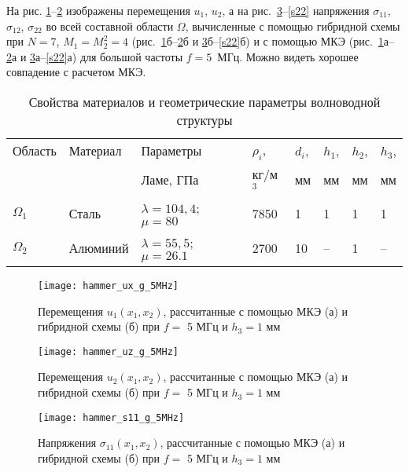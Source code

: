 \documentclass[press]{vestnik}
\begin{document}
На рис. \ref{u1_x}--\ref{u2_x} изображены перемещения $u_{1}$, $u_{2}$, а на рис.~\ref{s11}--\ref{s22} напряжения $\sigma_{11}$, $\sigma_{12}$, $\sigma_{22}$  во всей составной области $\Omega$, вычисленные с помощью гибридной схемы при $N=7$, $M_{1}=M_{2}^{2}=4$ (рис.~\ref{u1_x}б--\ref{u2_x}б и \ref{s11}б--\ref{s22}б) и с помощью МКЭ (рис.~\ref{u1_x}а--\ref{u2_x}а и \ref{s11}а--\ref{s22}а) для большой частоты $f= 5$~МГц. Можно видеть хорошее совпадение с расчетом МКЭ.
\begin{table}[b!] 
	\caption{Свойства материалов и геометрические параметры волноводной структуры} \label{mat}
	\begin{center}
		\begin{tabularx}{\textwidth}{|Y|Y|Y|Y|Y|Y|Y|Y|}
			\hline
			Область  & Материал &  Параметры  &$\rho_{i}$,& $d_{i}$,& $h_{1}$,& $h_{2}$,& $h_{3}$,
			\\
			& &    Ламе, ГПа     &кг/м$^{3}$ &мм & мм & мм & мм
			\\
			\hline
			$\Omega_{1}$ & Сталь & $\lambda=104,4$; $\mu=80$ & 7850 & 1 & 1 & 1 & 1 
			\\
			\hline
			$\Omega_{2}$ & Алюминий & $\lambda=55,5$; $\mu=26.1$ & 2700 & 10 & -- & 1  & -- 
			\\
			\hline
		\end{tabularx}
	\end{center}
\end{table}

\begin{figure}
	\begin{center}
		\texttt{[image: hammer\_ux\_g\_5MHz]}
		\caption{Перемещения $u_{1}(x_{1},x_{2})$, рассчитанные с помощью МКЭ (а) и гибридной схемы (б) при $f=$ 5 МГц и $h_{3}=1$ мм} \label{u1_x}
	\end{center}
\end{figure}

\begin{figure}
	\begin{center}
		\texttt{[image: hammer\_uz\_g\_5MHz]}
		\caption{Перемещения $u_{2}(x_{1},x_{2})$, рассчитанные с помощью МКЭ (а) и гибридной схемы (б) при $f=$ 5 МГц и $h_{3}=1$ мм} \label{u2_x}
	\end{center}
\end{figure}

\begin{figure}
	\begin{center}
		\texttt{[image: hammer\_s11\_g\_5MHz]}
		\caption{Напряжения $\sigma_{11}(x_{1},x_{2})$, рассчитанные с помощью МКЭ (а) и гибридной схемы (б) при $f=$ 5 МГц и $h_{3}=1$ мм} \label{s11}
	\end{center}
\end{figure}
\end{document}

